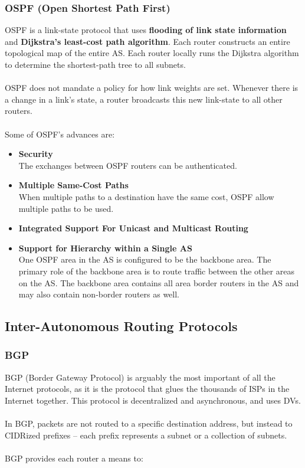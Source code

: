 \documentclass{article}
\begin{document}
\subsubsection{OSPF (Open Shortest Path First)}
OSPF is a link-state protocol that uses \textbf{flooding of link state information} and \textbf{Dijkstra's least-cost path algorithm}. Each router constructs an entire topological map of the entire AS. Each router locally runs the Dijkstra algorithm to determine the shortest-path tree to all subnets. \\ \\
OSPF does not mandate a policy for how link weights are set. Whenever there is a change in a link's state, a router broadcasts this new link-state to all other routers. \\ \\
Some of OSPF's advances are:

\begin{itemize}
	\item \textbf{Security}
	\vspace{.2cm} \\
	The exchanges between OSPF routers can be authenticated.
	
	\item \textbf{Multiple Same-Cost Paths}
	\vspace{.2cm} \\
	When multiple paths to a destination have the same cost, OSPF allow multiple paths to be used.
	
	\item \textbf{Integrated Support For Unicast and Multicast Routing}
	
	\item \textbf{Support for Hierarchy within a Single AS}
	\vspace{.2cm} \\
	One OSPF area in the AS is configured to be the backbone area. The primary role of the backbone area is to route traffic between the other areas on the AS. The backbone area contains all area border routers in the AS and may also contain non-border routers as well.
\end{itemize}

\subsection{Inter-Autonomous Routing Protocols}

\subsubsection{BGP}
BGP (Border Gateway Protocol) is arguably the most important of all the Internet protocols, as it is the protocol that glues the thousands of ISPs in the Internet together. This protocol is decentralized and asynchronous, and uses DVs. \\ \\
In BGP, packets are not routed to a specific destination address, but instead to CIDRized prefixes -- each prefix represents a subnet or a collection of subnets. \\ \\
BGP provides each router a means to:
\end{document}
